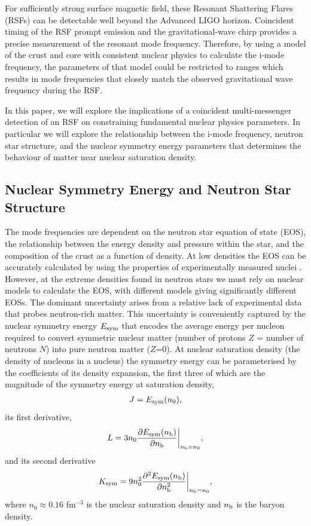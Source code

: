 \documentclass[fleqn,usenatbib]{mnras}
\begin{document}
For sufficiently strong surface magnetic field, these Resonant Shattering Flares (RSFs) can be detectable well beyond the Advanced LIGO horizon. Coincident timing of the RSF prompt emission and the gravitational-wave chirp provides a precise measurement of the resonant mode frequency. Therefore, by using a model of the crust and core with consistent nuclear physics to calculate the i-mode frequency, the parameters of that model could be restricted to ranges which results in mode frequencies that closely match the observed gravitational wave frequency during the RSF.  

In this paper, we will explore the implications of a coincident multi-messenger detection of an RSF on constraining fundamental nuclear physics parameters. In particular we will explore the relationship between the i-mode frequency, neutron star structure, and the nuclear symmetry energy parameters that determines the behaviour of matter near nuclear saturation density. 







\subsection{Nuclear Symmetry Energy and Neutron Star Structure}
\hspace{\parindent}The mode frequencies are dependent on the neutron star equation of state (EOS), the relationship between the energy density and pressure within the star, and the composition of the crust as a function of density. At low densities the EOS can be accurately calculated by using the properties of experimentally measured nuclei \citep{baym1971ground}. However, at the extreme densities found in neutron stars we must rely on nuclear models to calculate the EOS, with different models giving significantly different EOSs. The dominant uncertainty arises from a relative lack of experimental data that probes neutron-rich matter. This uncertainty is conveniently captured by the nuclear symmetry energy $E_{\rm sym}$ that encodes the average energy per nucleon required to convert symmetric nuclear matter (number of protons $Z$ = number of neutrons $N$) into pure neutron matter ($Z$=0). At nuclear saturation density (the density of nucleons in a nucleus) the symmetry energy can be parameterised by the coefficients of its density expansion, the first three of which are the magnitude of the symmetry energy at saturation density,
\begin{align}
J=E_{\rm sym}(n_0),    
\label{eq:sym_J}
\end{align}
\noindent its first derivative,
\begin{align}
L=3n_0\frac{\partial E_{\rm sym}(n_{\rm b})}{\partial n_{\rm b}}\biggr\rvert_{n_{\rm b}=n_0},  
\label{eq:sym_L}
\end{align}
\noindent and its second derivative
\begin{align}
K_{\rm sym}=9n_0^2\frac{\partial^2 E_{\rm sym}(n_{\rm b})}{\partial n_{\rm b}^2}\biggr\rvert_{n_{\rm b}=n_0},
\label{eq:sym_K}
\end{align}
\noindent where $n_0\approx 0.16$ fm$^{-3}$ is the nuclear saturation density and $n_{\rm b}$ is the baryon density.
\end{document}
